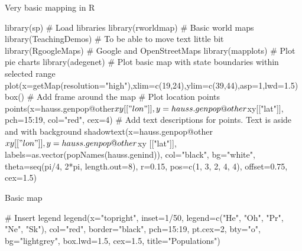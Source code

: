 \documentclass[compress, ucs, xelatex, 11pt, xcolor=svgnames, aspectratio=169,
	hyperref={
		bookmarks=true,
		unicode=true,
		colorlinks=true,
		pdftitle={Molecular data in R},
		plainpages=false,
		pdfauthor={Vojtech Zeisek},
		pdfsubject={Course about phylogeny and evolution in R},
		pdfcreator={XeLaTeX},
		pdfkeywords={R, evolution, phylogeny, molecular data},
		linkcolor=Crimson, %
		anchorcolor=Magenta, %
		citecolor=Magenta, %
		filecolor=Magenta, %
		menucolor=Magenta, %
		urlcolor=DodgerBlue, %
		pdftex},
	url={hyphens, lowtilde} %
	]{beamer}
\renewcommand{\texttt}[1]{\colorbox{Beige}{{\ttfamily #1}}}
\begin{document}
\begin{frame}[fragile]{Very basic mapping in R}
	\begin{spluscode}
    library(sp) # Load libraries
    library(rworldmap) # Basic world maps
    library(TeachingDemos) # To be able to move text little bit
    library(RgoogleMaps) # Google and OpenStreetMaps
    library(mapplots) # Plot pie charts
    library(adegenet)
    # Plot basic map with state boundaries within selected range
    plot(x=getMap(resolution="high"),xlim=c(19,24),ylim=c(39,44),asp=1,lwd=1.5)
    box() # Add frame around the map
    # Plot location points
    points(x=hauss.genpop@other$xy[["lon"]], y=hauss.genpop@other$xy[["lat"]],
      pch=15:19, col="red", cex=4)
    # Add text descriptions for points. Text is aside and with background
    shadowtext(x=hauss.genpop@other$xy[["lon"]], y=hauss.genpop@other$xy
      [["lat"]], labels=as.vector(popNames(hauss.genind)), col="black",
      bg="white", theta=seq(pi/4, 2*pi, length.out=8), r=0.15, pos=c(1,
      3, 2, 4, 4), offset=0.75, cex=1.5)
	\end{spluscode}
\end{frame}

\begin{frame}[fragile]{Basic map}
	\begin{spluscode}
    # Insert legend
    legend(x="topright", inset=1/50, legend=c("He", "Oh", "Pr", "Ne", "Sk"),
      col="red", border="black", pch=15:19, pt.cex=2, bty="o", bg="lightgrey",
      box.lwd=1.5, cex=1.5, title="Populations")
	\end{spluscode}
	\begin{center}
		\texttt{[image: map.png]}
	\end{center}
\end{frame}
\end{document}
